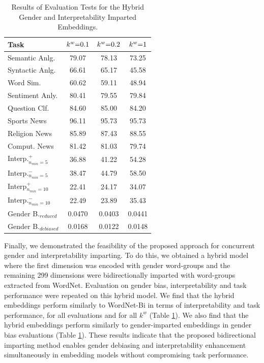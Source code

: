 \documentclass[11pt,a4paper]{article}
\begin{document}
\begin{table}
    \centering
	\begin{tabular}{lccc}
		\hline \hline 
		\textbf{Task} & \textbf{$\setlength{\thickmuskip}{0mu}k^w=0.1$} & \textbf{$\setlength{\thickmuskip}{0mu}k^w=0.2$} & \textbf{$\setlength{\thickmuskip}{0mu}k^w=1$}\\ \hline \hline %
	    Semantic Anlg. & 79.07 & 78.13 & 73.25 \\
	    Syntactic Anlg. & 66.61 & 65.17 & 45.58 \\ 
	    \hline %
	    Word Sim. & 60.62 & 59.11 & 48.94 \\
	    \hline %
	    Sentiment Anly. & 80.41 & 79.55 & 79.84 \\ \hline %
	    Question Clf. & 84.60 & 85.00 & 84.20 \\ \hline %
	    Sports News & 96.11 & 95.73 & 95.73 \\
	    Religion News & 85.89 & 87.43 & 88.55 \\
	    Comput. News & 81.42 & 81.03 & 79.74 \\\hline
	    Interp.$^+_{n_{min}=5}$ & 36.88 & 41.22 & 54.28 \\
	    Interp.$^-_{n_{min}=5}$ & 38.47 & 44.79 & 58.50 \\
	    Interp$^+_{n_{min}=10}$ & 22.41 & 24.17 & 34.07 \\
	    Interp.$^-_{n_{min}=10}$ & 22.49 & 23.89 & 35.43 \\\hline
	    Gender B.$_{reduced}$ & 0.0470 & 0.0403 & 0.0441 \\
	    Gender B.$_{debiased}$ & 0.0168 & 0.0122 & 0.0148 \\ 

	    \hline \hline %
	\end{tabular}
	\caption{ Results of Evaluation Tests for the Hybrid Gender and Interpretability Imparted Embeddings.}
	\label{tab:gender_plus_wordnet}	
\end{table}

Finally, we demonstrated the feasibility of the proposed approach for concurrent gender and interpretability imparting. To do this, we obtained a hybrid model where the first dimension was encoded with gender word-groups and the remaining 299 dimensions were bidirectionally imparted with word-groups extracted from WordNet. Evaluation on gender bias, interpretability and task performance were repeated on this hybrid model. We find that the hybrid embeddings perform similarly to WordNet-Bi in terms of interpretability and task performance, for all evaluations and for all $k^w$ (Table \ref{tab:gender_plus_wordnet}). We also find that the hybrid embeddings perform similarly to gender-imparted embeddings in gender bias evaluations (Table \ref{tab:gender_plus_wordnet}). These results indicate that the proposed bidirectional imparting method enables gender debiasing and interpretability enhancement simultaneously in embedding models without compromising task performance.
\end{document}
